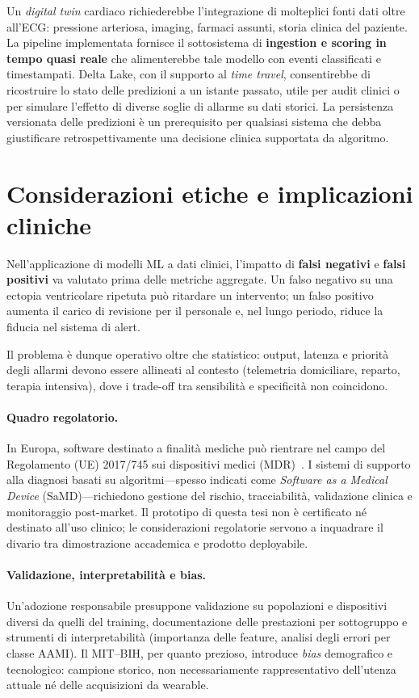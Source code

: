 Un \emph{digital twin} cardiaco richiederebbe l'integrazione di molteplici fonti dati oltre all'ECG: pressione arteriosa, imaging, farmaci assunti, storia clinica del paziente.
La pipeline implementata fornisce il sottosistema di \textbf{ingestion e scoring in tempo quasi reale} che alimenterebbe tale modello con eventi classificati e timestampati.
Delta Lake, con il supporto al \emph{time travel}, consentirebbe di ricostruire lo stato delle predizioni a un istante passato, utile per audit clinici o per simulare l'effetto di diverse soglie di allarme su dati storici.
La persistenza versionata delle predizioni è un prerequisito per qualsiasi sistema che debba giustificare retrospettivamente una decisione clinica supportata da algoritmo.

\section{Considerazioni etiche e implicazioni cliniche}\label{sec:considerazioni-etiche-e-implicazioni-cliniche}

Nell'applicazione di modelli ML a dati clinici, l'impatto di \textbf{falsi negativi} e \textbf{falsi positivi} va valutato prima delle metriche aggregate.
Un falso negativo su una ectopia ventricolare ripetuta può ritardare un intervento; un falso positivo aumenta il carico di revisione per il personale e, nel lungo periodo, riduce la fiducia nel sistema di alert.

Il problema è dunque operativo oltre che statistico: output, latenza e priorità degli allarmi devono essere allineati al contesto (telemetria domiciliare, reparto, terapia intensiva), dove i trade-off tra sensibilità e specificità non coincidono.

\paragraph{Quadro regolatorio.}
In Europa, software destinato a finalità mediche può rientrare nel campo del Regolamento (UE) 2017/745 sui dispositivi medici (MDR)~\cite{eu2017mdr}.
I sistemi di supporto alla diagnosi basati su algoritmi---spesso indicati come \emph{Software as a Medical Device} (SaMD)---richiedono gestione del rischio, tracciabilità, validazione clinica e monitoraggio post-market.
Il prototipo di questa tesi non è certificato né destinato all'uso clinico; le considerazioni regolatorie servono a inquadrare il divario tra dimostrazione accademica e prodotto deployabile.

\paragraph{Validazione, interpretabilità e bias.}
Un'adozione responsabile presuppone validazione su popolazioni e dispositivi diversi da quelli del training, documentazione delle prestazioni per sottogruppo e strumenti di interpretabilità (importanza delle feature, analisi degli errori per classe AAMI).
Il MIT--BIH, per quanto prezioso, introduce \emph{bias} demografico e tecnologico: campione storico, non necessariamente rappresentativo dell'utenza attuale né delle acquisizioni da wearable.

